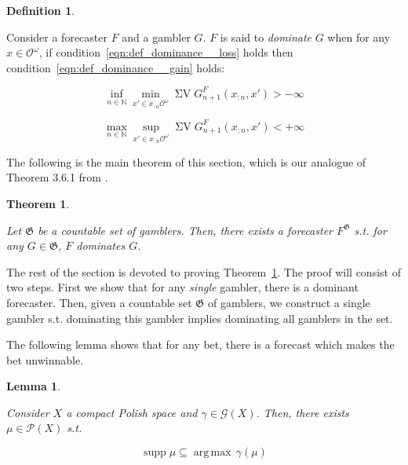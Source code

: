 \documentclass[11pt]{article}
\theoremstyle{definition}
\newtheorem{definition}{Definition}%
\theoremstyle{plain}
\newtheorem{theorem}{Theorem}%
\newtheorem{lemma}{Lemma}%
\newcommand{\Nats}{\mathbb{N}}
\newcommand{\Argmax}[1]{\underset{#1}{\operatorname{arg\,max}}\,}
\newcommand{\PM}{\mathcal{P}}
\DeclareMathOperator{\Sp}{supp}
\newcommand{\Ob}{\mathcal{O}}
\newcommand{\OO}{\Ob^\omega}
\newcommand{\Gm}{\mathcal{G}}
\DeclareMathOperator{\SV}{\Sigma V}
\begin{document}
\begin{definition}
\label{def:dominance}

Consider a forecaster $F$ and a gambler $G$. $F$ is said to \emph{dominate} $G$ when for any $x \in \OO$, if condition~\ref{eqn:def_dominance__loss} holds then condition~\ref{eqn:def_dominance__gain} holds:

\begin{equation}
\label{eqn:def_dominance__loss}
\inf_{n \in \Nats} \min_{x' \in x_{:n}\OO} {\SV G^F_{n+1}(x_{:n},x')} > -\infty
\end{equation}

\begin{equation}
\label{eqn:def_dominance__gain}
\max_{n \in \Nats} \sup_{x' \in x_{:n}\OO} {\SV G^F_{n+1}(x_{:n},x')} < +\infty
\end{equation}

\end{definition}

The following is the main theorem of this section, which is our analogue of Theorem 3.6.1 from \cite{Garrabrant_2016}.

\begin{theorem}
\label{thm:exist_dominant}

Let $\mathfrak{G}$ be a countable set of gamblers. Then, there exists a forecaster $F^\mathfrak{G}$ s.t. for any $G \in \mathfrak{G}$, $F$ dominates $G$.

\end{theorem}

The rest of the section is devoted to proving Theorem~\ref{thm:exist_dominant}. The proof will consist of two steps. First we show that for any \emph{single} gambler, there is a dominant forecaster. Then, given a countable set $\mathfrak{G}$ of gamblers, we construct a single gambler s.t. dominating this gambler implies dominating all gamblers in the set.

The following lemma shows that for any bet, there is a forecast which makes the bet unwinnable.

\begin{lemma}
\label{lmm:unwinnable}

Consider $X$ a compact Polish space and $\gamma \in \Gm(X)$. Then, there exists $\mu \in \PM(X)$ s.t.

\begin{equation}
\Sp \mu \subseteq \Argmax{} \gamma(\mu)
\end{equation}

\end{lemma}
\end{document}
